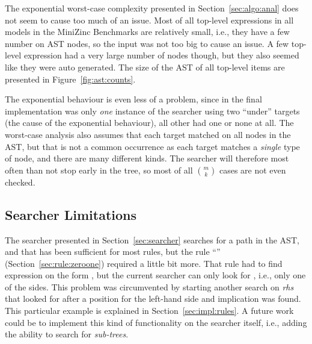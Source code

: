 \documentclass[a4paper,12pt]{article}
\newcommand{\ruleref}[1]{``\nameref{sec:rule:#1}'' (Section~\ref{sec:rule:#1})}
\begin{document}
The exponential
worst-case complexity presented in Section~\ref{sec:algo:anal} does not seem to cause too much
of an issue. Most of all top-level expressions in all models in the MiniZinc Benchmarks are
relatively small, i.e., they have a few number on AST nodes,
so the input was not too big to cause an issue.
A few top-level expression had a very large number
of nodes though, but they also seemed like they were auto generated.
The size of the AST of all top-level items are presented in Figure~\ref{fig:ast:counts}.



The exponential behaviour is even less of a problem, since in the final implementation was
only \emph{one} instance of the searcher using two ``under'' targets (the cause of the
exponential behaviour), all other had one or none at all. The worst-case analysis also
assumes that each target matched on all nodes in the AST, but that is not a common
occurrence as each target matches a \emph{single} type of node, and there are many
different kinds. The searcher will therefore most often than not stop early in the tree,
so most of all $\binom{m}{k}$ cases are not even checked.

\subsection{Searcher Limitations}
The searcher presented in Section~\ref{sec:searcher} searches for a path in the AST, and
that has been sufficient for most rules, but the rule \ruleref{zeroone} required a little
bit more. That rule had to find expression on the form , but the current
searcher can only look for , i.e., only one of the sides. This problem was
circumvented by starting another search on \textit{rhs} that looked for  after a
position for the left-hand side and implication was found. This particular example is
explained in Section~\ref{sec:impl:rules}. A future work could be to implement this kind
of functionality on the searcher itself, i.e., adding the ability to search for
\emph{sub-trees}.
\end{document}
